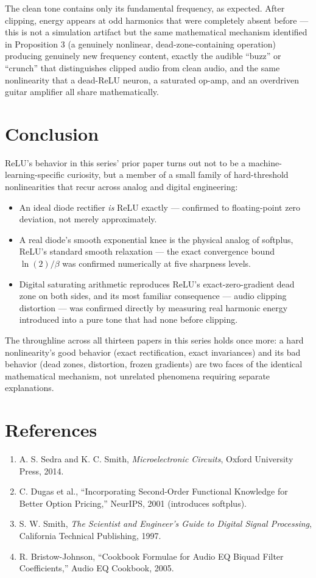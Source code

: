 \documentclass[10pt,journal,compsoc]{IEEEtran}
\begin{document}
The clean tone contains only its fundamental frequency, as expected. After clipping, energy appears at odd harmonics that were completely absent before — this is not a simulation artifact but the same mathematical mechanism identified in Proposition 3 (a genuinely nonlinear, dead-zone-containing operation) producing genuinely new frequency content, exactly the audible ``buzz'' or ``crunch'' that distinguishes clipped audio from clean audio, and the same nonlinearity that a dead-ReLU neuron, a saturated op-amp, and an overdriven guitar amplifier all share mathematically.

\section{Conclusion}
ReLU's behavior in this series' prior paper turns out not to be a machine-learning-specific curiosity, but a member of a small family of hard-threshold nonlinearities that recur across analog and digital engineering:
\begin{itemize}
    \item An ideal diode rectifier \emph{is} ReLU exactly — confirmed to floating-point zero deviation, not merely approximately.
    \item A real diode's smooth exponential knee is the physical analog of softplus, ReLU's standard smooth relaxation — the exact convergence bound $\ln(2)/\beta$ was confirmed numerically at five sharpness levels.
    \item Digital saturating arithmetic reproduces ReLU's exact-zero-gradient dead zone on both sides, and its most familiar consequence — audio clipping distortion — was confirmed directly by measuring real harmonic energy introduced into a pure tone that had none before clipping.
\end{itemize}
The throughline across all thirteen papers in this series holds once more: a hard nonlinearity's good behavior (exact rectification, exact invariances) and its bad behavior (dead zones, distortion, frozen gradients) are two faces of the identical mathematical mechanism, not unrelated phenomena requiring separate explanations.

\section*{References}
\begin{small}
\begin{enumerate}
    \item A. S. Sedra and K. C. Smith, \textit{Microelectronic Circuits}, Oxford University Press, 2014.
    \item C. Dugas et al., ``Incorporating Second-Order Functional Knowledge for Better Option Pricing,'' NeurIPS, 2001 (introduces softplus).
    \item S. W. Smith, \textit{The Scientist and Engineer's Guide to Digital Signal Processing}, California Technical Publishing, 1997.
    \item R. Bristow-Johnson, ``Cookbook Formulae for Audio EQ Biquad Filter Coefficients,'' Audio EQ Cookbook, 2005.
\end{enumerate}
\end{small}
\end{document}
